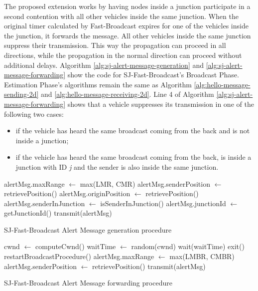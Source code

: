 		
		The proposed extension works by having nodes inside a junction participate in a second contention with all other vehicles inside the same junction. When the original timer calculated by Fast-Broadcast expires for one of the vehicles inside the junction, it forwards the message. All other vehicles inside the same junction suppress their transmission. This way the propagation can proceed in all directions, while the propagation in the normal direction can proceed without additional delays. Algorithm \ref{alg:sj-alert-message-generation} and \ref{alg:sj-alert-message-forwarding} show the code for SJ-Fast-Broadcast's Broadcast Phase. Estimation Phase's algorithms remain the same as Algorithm \ref{alg:hello-message-sending-2d} and \ref{alg:hello-message-receiving-2d}. Line 4 of Algorithm \ref{alg:sj-alert-message-forwarding} shows that a vehicle suppresses its transmission in one of the following two cases:
		\begin{itemize}
			\item if the vehicle has heard the same broadcast coming from the back and is not inside a junction;
			\item if the vehicle has heard the same broadcast coming from the back, is inside a junction with ID \textit{j} and the sender is also inside the same junction.
		\end{itemize}
		
		\begin{algorithm}[H]
			\begin{algorithmic}[1]
				\State alertMsg.maxRange $\gets$ max(LMR, CMR)
				\State alertMsg.senderPosition $\gets$ retrievePosition()
				\State alertMsg.originPosition $\gets$ retrievePosition()
				\State alertMsg.senderInJunction $\gets$ isSenderInJunction()
				\State alertMsg.junctionId $\gets$ getJunctionId()
				\State transmit(alertMsg)
			\end{algorithmic}
			\caption{SJ-Fast-Broadcast Alert Message generation procedure}
			\label{alg:sj-alert-message-generation}
		\end{algorithm}
		
		\begin{algorithm}[H]
			\begin{algorithmic}[1]
				\State cwnd $\gets$ computeCwnd()
				\State waitTime $\gets$ random(cwnd)
				\State wait(waitTime)
				\State exit()
				\State restartBroadcastProcedure()
				\Else 
				\State alertMsg.maxRange $\gets$ max(LMBR, CMBR)
				\State alertMsg.senderPosition $\gets$ retrievePosition()
				\State transmit(alertMsg)
				\EndIf 
			\end{algorithmic}
			\caption{SJ-Fast-Broadcast Alert Message forwarding procedure}
			\label{alg:sj-alert-message-forwarding}
		\end{algorithm}
	
